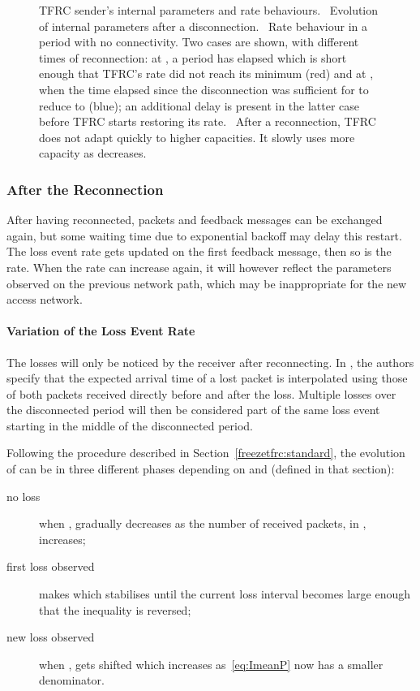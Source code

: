 \documentclass[twocolumn]{nictatechreport}
\begin{document}
\begin{figure*}[tb]
  \caption[TFRC sender's internal parameters and rate behaviours.]{TFRC sender's
  internal parameters and rate behaviours.
  ~Evolution of internal parameters after a
  disconnection. ~Rate behaviour in a period with no
  connectivity. Two cases are shown, with different times of reconnection: at
  , a period  has elapsed which is short enough that TFRC's rate did
  not reach its minimum (red) and at , when the time 
  elapsed since the disconnection was sufficient for  to reduce to
   (blue); an additional delay  is present in
  the latter case before TFRC starts restoring its rate.
  ~After a reconnection, TFRC does not adapt
  quickly to higher capacities. It slowly uses more capacity as  decreases.}

\end{figure*}

\subsubsection{After the Reconnection}
\label{sec:after-reco}

After having reconnected, packets and feedback messages can be exchanged again,
but some waiting time due to exponential backoff may delay this restart.  The
loss event rate  gets updated on the first feedback message, then so is the
rate. When the rate can increase again, it will however reflect the parameters
observed on the previous network path, which may be inappropriate for the new
access network.

\paragraph{Variation of the Loss Event Rate}

The losses will only be noticed by the receiver after reconnecting.  In
\cite{rfc5348}, the authors specify that the expected arrival time of a lost
packet is interpolated using those of both packets received directly before and
after the loss. Multiple losses over the disconnected period will then be
considered part of the same loss event starting in the middle of the
disconnected period.

Following the procedure described in Section~\ref{freezetfrc:standard}, the
evolution of  can be in three different phases depending on  and 
(defined in that section):
\begin{description}
  \item[no loss] when ,  gradually decreases as the number of
    received packets, in , increases;
  \item[first loss observed] makes  which stabilises  until the current loss
    interval  becomes large enough that the inequality is reversed;
  \item[new loss observed] when ,  gets shifted which increases
     as~\eqref{eq:ImeanP} now has a smaller denominator.
\end{description}
\end{document}
